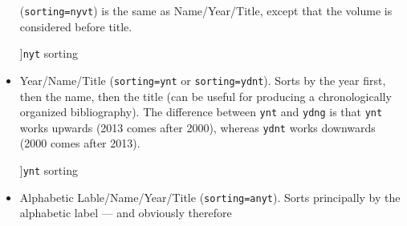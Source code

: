 \begin{itemize}
  (\texttt{sorting=nyvt}) is the same as Name/Year/Title, except that
  the volume is considered before title.
\begin{marginfigure}[-15ex]
  \vspace{3pt}
  \caption[][]{\texttt{nyt} sorting}
  \end{marginfigure}
\item
  Year/Name/Title (\texttt{sorting=ynt} or \texttt{sorting=ydnt}). Sorts
  by the year first, then the name, then the title (can be useful for
  producing a chronologically organized bibliography). The difference
  between \texttt{ynt} and \texttt{ydng} is that \texttt{ynt} works
  upwards (2013 comes after 2000), whereas \texttt{ydnt} works downwards
  (2000 comes after 2013).
  \begin{marginfigure}[1ex]
  \vspace{3pt}
\caption[][]{\texttt{ynt} sorting}
\end{marginfigure}
\item
  Alphabetic Lable/Name/Year/Title (\texttt{sorting=anyt}). Sorts
  principally by the alphabetic label --- and obviously therefore

\end{itemize}

